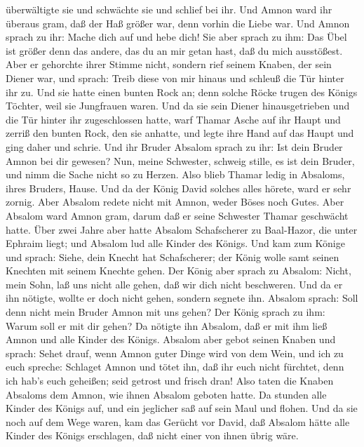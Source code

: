 überwältigte sie und schwächte sie und schlief bei ihr. 
Und Amnon ward ihr überaus gram, daß der Haß größer war, denn vorhin die
Liebe war. Und Amnon sprach zu ihr: Mache dich auf und hebe dich!
 Sie aber sprach zu ihm: Das Übel ist größer denn das
andere, das du an mir getan hast, daß du mich ausstößest. Aber er
gehorchte ihrer Stimme nicht,  sondern rief seinem Knaben,
der sein Diener war, und sprach: Treib diese von mir hinaus und schleuß
die Tür hinter ihr zu.  Und sie hatte einen bunten Rock an;
denn solche Röcke trugen des Königs Töchter, weil sie Jungfrauen waren.
Und da sie sein Diener hinausgetrieben und die Tür hinter ihr
zugeschlossen hatte,  warf Thamar Asche auf ihr Haupt und
zerriß den bunten Rock, den sie anhatte, und legte ihre Hand auf das
Haupt und ging daher und schrie.  Und ihr Bruder Absalom
sprach zu ihr: Ist dein Bruder Amnon bei dir gewesen? Nun, meine
Schwester, schweig stille, es ist dein Bruder, und nimm die Sache nicht
so zu Herzen. Also blieb Thamar ledig in Absaloms, ihres Bruders, Hause.
 Und da der König David solches alles hörete, ward er sehr
zornig. Aber Absalom redete nicht mit Amnon, weder Böses noch Gutes.
 Aber Absalom ward Amnon gram, darum daß er seine Schwester
Thamar geschwächt hatte.  Über zwei Jahre aber hatte
Absalom Schafscherer zu Baal-Hazor, die unter Ephraim liegt; und Absalom
lud alle Kinder des Königs.  Und kam zum Könige und sprach:
Siehe, dein Knecht hat Schafscherer; der König wolle samt seinen
Knechten mit seinem Knechte gehen.  Der König aber sprach
zu Absalom: Nicht, mein Sohn, laß uns nicht alle gehen, daß wir dich
nicht beschweren. Und da er ihn nötigte, wollte er doch nicht gehen,
sondern segnete ihn.  Absalom sprach: Soll denn nicht mein
Bruder Amnon mit uns gehen? Der König sprach zu ihm: Warum soll er mit
dir gehen?  Da nötigte ihn Absalom, daß er mit ihm ließ
Amnon und alle Kinder des Königs.  Absalom aber gebot
seinen Knaben und sprach: Sehet drauf, wenn Amnon guter Dinge wird von
dem Wein, und ich zu euch spreche: Schlaget Amnon und tötet ihn, daß ihr
euch nicht fürchtet, denn ich hab's euch geheißen; seid getrost und
frisch dran!  Also taten die Knaben Absaloms dem Amnon, wie
ihnen Absalom geboten hatte. Da stunden alle Kinder des Königs auf, und
ein jeglicher saß auf sein Maul und flohen.  Und da sie
noch auf dem Wege waren, kam das Gerücht vor David, daß Absalom hätte
alle Kinder des Königs erschlagen, daß nicht einer von ihnen übrig wäre.
